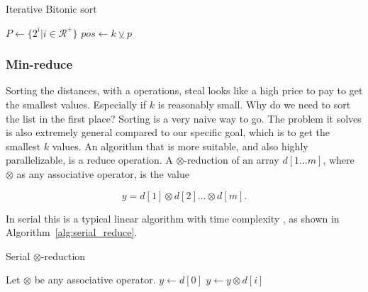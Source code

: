 \begin{algorithm}[ht]
\caption{Iterative Bitonic sort}
\label{alg:bitonic_sort}
\begin{algorithmic}
    \State $P \gets \{2^i|i \in \mathcal{R}^+ \}$
                \ForAll{$i \in [0,m)$}
                \State $pos \gets k \veebar p$ 
                     
                        \State {}
                    \EndIf
                        \State {}
                    \EndIf
                \EndIf
                \EndFor
            \EndFor
        \EndFor
    \EndFunction
    \Statex
    \State {}
    \EndIf
    \EndFunction
\end{algorithmic}
\end{algorithm}


\subsubsection{Min-reduce} %
\label{ssub:min_reduce}

Sorting the distances, with a  operations, steal looks like a high price to pay to get the smallest values. Especially if $k$ is reasonably small. Why do we need to sort the list in the first place? Sorting is a very naive way to go. The problem it solves is also extremely general compared to our specific goal, which is to get the smallest $k$ values. An algorithm that is more suitable, and also highly parallelizable, is a reduce operation. A $\otimes$-reduction of an array $d[1 \dots m]$, where $\otimes$ as any associative operator, is the value

     $$ y = d[1] \otimes d[2] \dots \otimes d[m].$$\cite{Cormen:2001}

In serial this is a typical linear algorithm with time complexity , as shown in Algorithm~\ref{alg:serial_reduce}. 

\begin{algorithm}[ht]
\caption{Serial $\otimes$-reduction}
\label{alg:serial_reduce}
\begin{algorithmic}
    \State Let $\otimes$ be any associative operator.
        \State $y \gets d[0]$
            \State $y \gets y \otimes d[i]$
        \EndFor
    \EndFunction
\end{algorithmic}
\end{algorithm}

